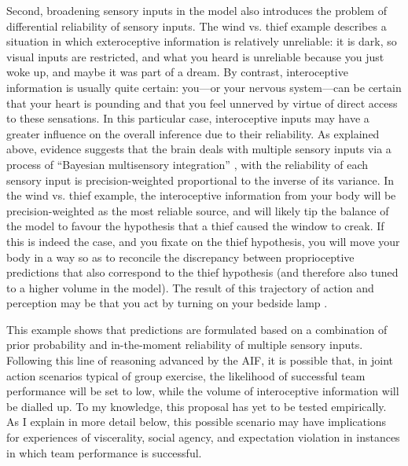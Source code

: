 \begin{CJK}{UTF8}{gbsn}
Second, broadening sensory inputs in the model also introduces the problem of differential reliability of sensory inputs.  The wind vs. thief example describes a situation in which exteroceptive information is relatively unreliable: it is dark, so visual inputs are restricted, and what you heard is unreliable because you just woke up, and maybe it was part of a dream.  By contrast, interoceptive information is usually quite certain: you---or your nervous system---can be certain that your heart is pounding and that you feel unnerved by virtue of direct access to these sensations.  In this particular case, interoceptive inputs may have a greater influence on the overall inference due to their reliability.  As explained above, evidence suggests that the brain deals with multiple sensory inputs via a process of ``Bayesian multisensory integration'' \citep{Ernst2004}, with the reliability of each sensory input is precision-weighted proportional to the inverse of its variance.  In the wind vs. thief example, the interoceptive information from your body will be precision-weighted as the most reliable source, and will likely tip the balance of the model to favour the hypothesis that a thief caused the window to creak.  If this is indeed the case, and you fixate on the thief hypothesis, you will move your body in a way so as to reconcile the discrepancy between proprioceptive predictions that also correspond to the thief hypothesis (and therefore also tuned to a higher volume in the model).  The result of this trajectory of action and perception may be that you act by turning on your bedside lamp \citep{Pezzulo2014}.

This example shows that predictions are formulated based on a combination of prior probability and in-the-moment reliability of multiple sensory inputs.  Following this line of reasoning advanced by the AIF, it is possible that, in joint action scenarios typical of group exercise, the likelihood of successful team performance will be set to low, while the volume of interoceptive information will be dialled up. To my knowledge, this proposal has yet to be tested empirically.  As I explain in more detail below, this possible scenario may have implications for experiences of viscerality, social agency, and expectation violation in instances in which team performance is successful.




\end{CJK}
